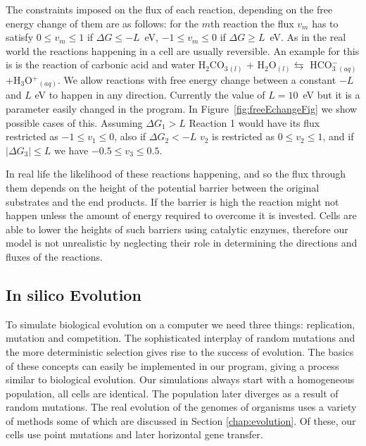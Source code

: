 \documentclass[a4paper,12pt]{article}
\begin{document}
	The constraints imposed on the flux of each reaction, depending on the free energy change of them are as follows: for the $m$th reaction the flux $v_m$ has to satisfy $0\leq v_m \leq 1 $ if $\Delta G \leq -L$~eV, $-1\leq v_m \leq 0 $ if $\Delta G \geq L$~eV. As in the real world the reactions happening in a cell are usually reversible.  An example for this is is the reaction of carbonic acid and water H$_2$CO$_3$$_{(l)}$ + H$_2$O$_{(l)} \leftrightarrows$ HCO$^-_3$$_{(aq)}$+H$_3$O$^+$$_{(aq)}$. We allow reactions with free energy change between a constant $-L$ and $L$ eV to happen in any direction. Currently the value of $L=10$~eV but it is a parameter easily changed in the program. In Figure~\ref{fig:freeEchangeFig} we show possible cases of this. Assuming $\Delta G_1 > L$ Reaction 1 would have its flux restricted as $-1\leq v_1 \leq 0$, also if $\Delta G_2 < -L$ $v_2$ is restricted as $0 \leq v_2 \leq 1$, and if $|\Delta G_3 | \leq L$ we have $-0.5 \leq v_3 \leq 0.5$. 

	In real life the likelihood of these reactions happening, and so the flux through them depends on the height of the potential barrier between the original substrates and the end products. If the barrier is high the reaction might not happen unless the amount of energy required to overcome it is invested. Cells are able to lower the heights of such barriers using catalytic enzymes, therefore our model is not unrealistic by neglecting their role in determining the directions and fluxes of the reactions. 

\subsection{In silico Evolution}
\label{sub:implementing evolution}
To simulate biological evolution on a computer we need three things: replication, mutation and competition. The sophisticated interplay of random mutations and the more deterministic selection gives rise to the success of evolution. The basics of these concepts can easily be implemented in our program, giving a process similar to biological evolution. Our simulations always start with a homogeneous population, all cells are identical. The population later diverges as a result of random mutations. The real evolution of the genomes of organisms uses a variety of methods some of which are discussed in Section \ref{chap:evolution}. Of these, our cells use point mutations and later horizontal gene transfer.
	
\end{document}
